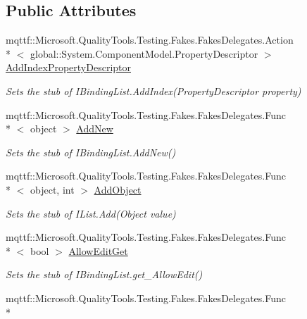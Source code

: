 \subsection*{Public Attributes}
\begin{DoxyCompactItemize}
\item 
mqttf\-::\-Microsoft.\-Quality\-Tools.\-Testing.\-Fakes.\-Fakes\-Delegates.\-Action\\*
$<$ global\-::\-System.\-Component\-Model.\-Property\-Descriptor $>$ \hyperlink{class_system_1_1_component_model_1_1_fakes_1_1_stub_i_binding_list_afeaaba205b5f79c8a82f78a9d0e934dd}{Add\-Index\-Property\-Descriptor}
\begin{DoxyCompactList}\small\item\em Sets the stub of I\-Binding\-List.\-Add\-Index(\-Property\-Descriptor property)\end{DoxyCompactList}\item 
mqttf\-::\-Microsoft.\-Quality\-Tools.\-Testing.\-Fakes.\-Fakes\-Delegates.\-Func\\*
$<$ object $>$ \hyperlink{class_system_1_1_component_model_1_1_fakes_1_1_stub_i_binding_list_a301bdf27264f4bcd26792270273479b8}{Add\-New}
\begin{DoxyCompactList}\small\item\em Sets the stub of I\-Binding\-List.\-Add\-New()\end{DoxyCompactList}\item 
mqttf\-::\-Microsoft.\-Quality\-Tools.\-Testing.\-Fakes.\-Fakes\-Delegates.\-Func\\*
$<$ object, int $>$ \hyperlink{class_system_1_1_component_model_1_1_fakes_1_1_stub_i_binding_list_a5ea6df468fc86ac511f72362fac11a41}{Add\-Object}
\begin{DoxyCompactList}\small\item\em Sets the stub of I\-List.\-Add(\-Object value)\end{DoxyCompactList}\item 
mqttf\-::\-Microsoft.\-Quality\-Tools.\-Testing.\-Fakes.\-Fakes\-Delegates.\-Func\\*
$<$ bool $>$ \hyperlink{class_system_1_1_component_model_1_1_fakes_1_1_stub_i_binding_list_a263d5f06880e9708e7e7304c7ebd0c87}{Allow\-Edit\-Get}
\begin{DoxyCompactList}\small\item\em Sets the stub of I\-Binding\-List.\-get\-\_\-\-Allow\-Edit()\end{DoxyCompactList}\item 
mqttf\-::\-Microsoft.\-Quality\-Tools.\-Testing.\-Fakes.\-Fakes\-Delegates.\-Func\\*

\end{DoxyCompactItemize}
